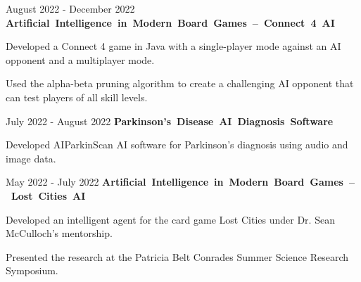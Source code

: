 \documentclass[10pt, letterpaper]{article}
\begin{document}
\vspace{\entrySpacing}\begin{twocolentry}{August 2022 - December 2022}
    \mbox{\textbf{Artificial Intelligence in Modern Board Games -- Connect 4 AI}}
\end{twocolentry}

\vspace{\highlightSpacing}
\begin{onecolentry}
    \begin{highlights}
        \item Developed a Connect 4 game in Java with a single-player mode against an AI opponent and a multiplayer mode.
        \item Used the alpha-beta pruning algorithm to create a challenging AI opponent that can test players of all skill levels.
    \end{highlights}
\end{onecolentry}

\vspace{\entrySpacing}\begin{twocolentry}{July 2022 - August 2022}
    \mbox{\textbf{Parkinson's Disease AI Diagnosis Software}}
\end{twocolentry}

\vspace{\highlightSpacing}
\begin{onecolentry}
    \begin{highlights}
        \item Developed AIParkinScan AI software for Parkinson's diagnosis using audio and image data.
    \end{highlights}
\end{onecolentry}

\vspace{\entrySpacing}\begin{twocolentry}{May 2022 - July 2022}
    \mbox{\textbf{Artificial Intelligence in Modern Board Games -- Lost Cities AI}}
\end{twocolentry}

\vspace{\highlightSpacing}
\begin{onecolentry}
    \begin{highlights}
        \item Developed an intelligent agent for the card game Lost Cities under Dr. Sean McCulloch's mentorship.
        \item Presented the research at the Patricia Belt Conrades Summer Science Research Symposium.
    \end{highlights}
\end{onecolentry}
\end{document}
